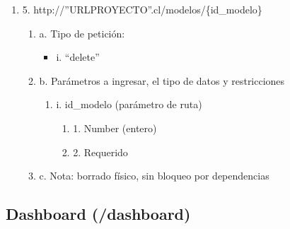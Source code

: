 \begin{enumerate}
    \item 5. http://”URLPROYECTO”.cl/modelos/\{id\_modelo\}
    \begin{enumerate}
        \item a. Tipo de petición:
            \begin{itemize}
               \item i. “delete”
            \end{itemize}
        \item b. Parámetros a ingresar, el tipo de datos y restricciones
            \begin{enumerate}
                \item i. id\_modelo (parámetro de ruta)
                    \begin{enumerate}
                        \item 1. Number (entero)
                        \item 2. Requerido
                    \end{enumerate}
            \end{enumerate}
        \item c. Nota: borrado físico, sin bloqueo por dependencias
    \end{enumerate}
\end{enumerate}

\subsection{Dashboard (/dashboard)}


